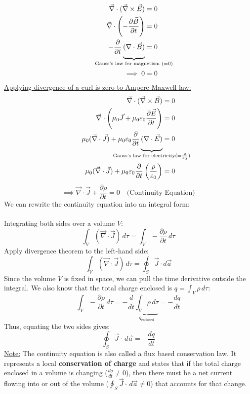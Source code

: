\documentclass[12pt]{article}
\begin{document}
\begin{align*}
    \vec{\nabla}\cdot(\vec{\nabla}\times\vec{E}) &= 0 \\
\quad \vec{\nabla}\cdot\left(-\frac{\partial \vec{B}}{\partial t}\right) &= 0\\
    -\frac{\partial}{\partial t} \underbrace{(\nabla \cdot \vec{B})\rule[-10pt]{0pt}{0pt}}_{\mathclap{\text{Gauss's law for magnetism } (=0)}} &= 0 \\
    \implies 0 &= 0
\end{align*}
\underline{Applying divergence of a curl is zero to Ampere-Maxwell law:}
\begin{align*}
    \vec{\nabla}\cdot(\vec{\nabla}\times\vec{B}) &= 0 \\
    \quad \vec{\nabla}\cdot\left(\mu_0\vec{J}+\mu_0\varepsilon_0 \frac{\partial \vec{E}}{\partial t}\right) &= 0 \\
    \mu_0(\vec{\nabla}\cdot\vec{J}) + \mu_0\varepsilon_0 \frac{\partial}{\partial t} \underbrace{(\nabla \cdot \vec{E}) \rule[-10pt]{0pt}{0pt}}_{\mathclap{\text{Gauss's law for electricity}(=\frac{\rho}{\varepsilon_0})}} &= 0 \\
    \mu_0(\vec{\nabla}\cdot\vec{J}) + \mu_0\varepsilon_0 \frac{\partial}{\partial t} \left(\frac{\rho}{\varepsilon_0}\right) &= 0
\end{align*}
\[\implies \boxed{\vec{\nabla}\cdot\vec{J} + \frac{\partial \rho}{\partial t} = 0}\quad \text{(Continuity Equation)}\]
We can rewrite the continuity equation into an integral form:\\\\
Integrating both sides over a volume $V$:
\[\int_V (\vec{\nabla} \cdot \vec{J}) \, d\tau = \int_V - \frac{\partial \rho}{\partial t} \, d\tau\]
Apply divergence theorem to the left-hand side:
\[\int_V (\vec{\nabla} \cdot \vec{J}) \, d\tau = \oint_S \vec{J} \cdot d\vec{a}\]
Since the volume $V$ is fixed in space, we can pull the time derivative outside the integral. We also know that the total charge enclosed is $q = \int_V \rho \, d\tau$:
\[\int_V - \frac{\partial \rho}{\partial t} \, d\tau = - \frac{d}{dt} \underbrace{\int_V \rho \, d\tau}_{q_{\text{enclosed}}} = - \frac{dq}{dt}\]
Thus, equating the two sides gives:
\[\boxed{\oint_S \vec{J}\cdot\,d\vec{a} = -\frac{dq}{dt}}\]
\underline{Note:} The continuity equation is also called a flux based conservation law. It represents a local \textbf{conservation of charge} and states that if the total charge enclosed in a volume is changing ($\frac{dq}{dt} \neq 0$), then there must be a net current flowing into or out of the volume ($\oint_S \vec{J}\cdot\,d\vec{a} \neq 0$) that accounts for that change.
\end{document}

